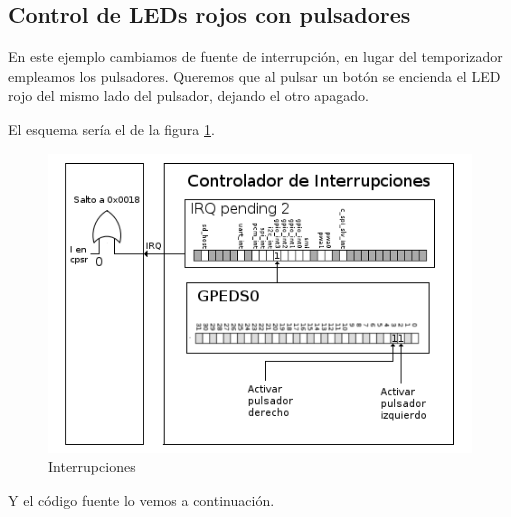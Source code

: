 \subsection{Control de LEDs rojos con pulsadores}

En este ejemplo cambiamos de fuente de interrupción, en lugar del temporizador empleamos
los pulsadores. Queremos que al pulsar un botón se encienda el LED rojo del mismo lado del
pulsador, dejando el otro apagado.

El esquema sería el de la figura \ref{fig:inter3}.

\begin{figure}[h]
  \centering
    \includegraphics[width=14cm]{graphs/inter3.png}
  \caption{Interrupciones}
  \label{fig:inter3}
\end{figure}

Y el código fuente lo vemos a continuación.

